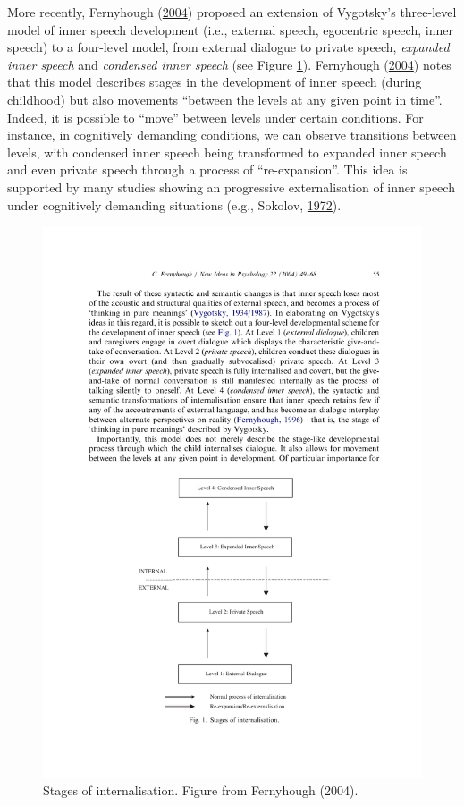 \documentclass[a4paper,12pt,twoside,onecolumn,openright,final,oldfontcommands]{memoir}
\begin{document}
More recently, Fernyhough (\protect\hyperlink{ref-fernyhough_alien_2004}{2004}) proposed an extension of Vygotsky's three-level model of inner speech development (i.e., external speech, egocentric speech, inner speech) to a four-level model, from external dialogue to private speech, \emph{expanded inner speech} and \emph{condensed inner speech} (see Figure \ref{fig:fernyhough}). Fernyhough (\protect\hyperlink{ref-fernyhough_alien_2004}{2004}) notes that this model describes stages in the development of inner speech (during childhood) but also movements \enquote{between the levels at any given point in time}. Indeed, it is possible to \enquote{move} between levels under certain conditions. For instance, in cognitively demanding conditions, we can observe transitions between levels, with condensed inner speech being transformed to expanded inner speech and even private speech through a process of \enquote{re-expansion}. This idea is supported by many studies showing an progressive externalisation of inner speech under cognitively demanding situations (e.g., Sokolov, \protect\hyperlink{ref-sokolov_inner_1972}{1972}).

\begin{figure}[ht]

{\centering \includegraphics[width=0.75\linewidth]{assets/fernyhough_model_2004} 

}

\caption{Stages of internalisation. Figure from Fernyhough (2004).}\label{fig:fernyhough}
\end{figure}
\end{document}

